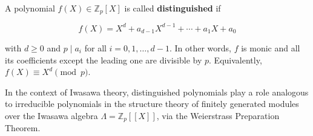 A polynomial $f(X) \in \mathbb{Z}_p[X]$ is called \textbf{distinguished} if

$$f(X) = X^d + a_{d-1}X^{d-1} + \cdots + a_1 X + a_0$$

with $d \geq 0$ and $p \mid a_i$ for all $i = 0, 1, \ldots, d-1$. In other words, $f$ is monic and all its coefficients except the leading one are divisible by $p$. Equivalently, $f(X) \equiv X^d \pmod{p}$.

In the context of Iwasawa theory, distinguished polynomials play a role analogous to irreducible polynomials in the structure theory of finitely generated modules over the Iwasawa algebra $\Lambda = \mathbb{Z}_p[[X]]$, via the Weierstrass Preparation Theorem.
